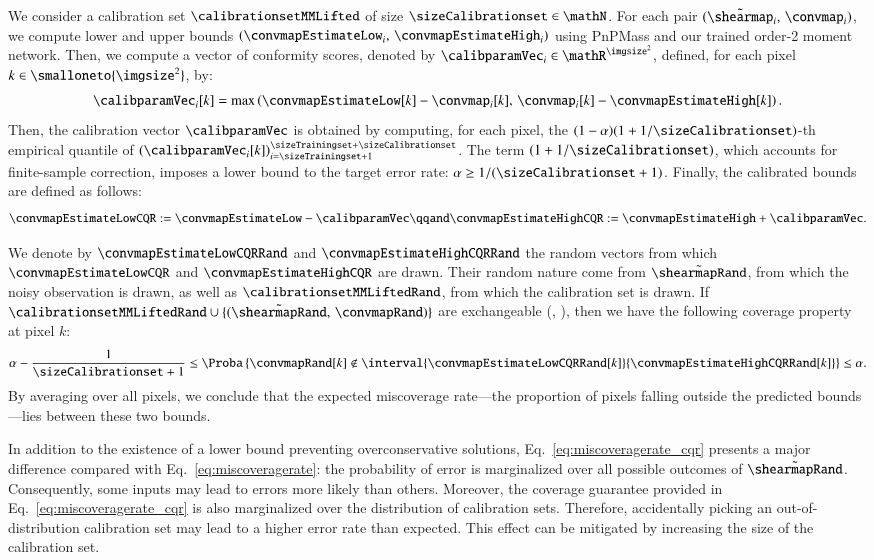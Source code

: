 \documentclass{aa}
\begin{document}
We consider a calibration set $\calibrationsetMMLifted$ of size $\sizeCalibrationset \in \mathN$. For each pair $(\tilde\shearmap_i,\, \convmap_i)$, we compute lower and upper bounds $(\convmapEstimateLow_i,\, \convmapEstimateHigh_i)$ using PnPMass and our trained order-2 moment network. Then, we compute a vector of conformity scores, denoted by $\calibparamVec_i \in \mathR^{\imgsize^2}$, defined, for each pixel $k \in \smalloneto{\imgsize^2}$, by:
\begin{equation}
    \calibparamVec_i[k] = \max\left(
        \convmapEstimateLow[k] - \convmap_i[k],\, \convmap_i[k] - \convmapEstimateHigh[k]
    \right).
\end{equation}
Then, the calibration vector $\calibparamVec$ is obtained by computing, for each pixel, the $(1 - \alpha)(1 + 1/\sizeCalibrationset)$-th empirical quantile of $(\calibparamVec_i[k])_{i=\sizeTrainingset + 1}^{\sizeTrainingset + \sizeCalibrationset}$. The term $(1 + 1/\sizeCalibrationset)$, which accounts for finite-sample correction, imposes a lower bound to the target error rate: $\alpha \geq 1 / (\sizeCalibrationset + 1)$.
Finally, the calibrated bounds are defined as follows:
\begin{equation}
    \convmapEstimateLowCQR := \convmapEstimateLow - \calibparamVec \qqand \convmapEstimateHighCQR := \convmapEstimateHigh + \calibparamVec.
\end{equation}

We denote by $\convmapEstimateLowCQRRand$ and $\convmapEstimateHighCQRRand$ the random vectors from which $\convmapEstimateLowCQR$ and $\convmapEstimateHighCQR$ are drawn. Their random nature come from $\tilde\shearmapRand$, from which the noisy observation is drawn, as well as $\calibrationsetMMLiftedRand$, from which the calibration set is drawn. If $\calibrationsetMMLiftedRand \cup \{(\tilde\shearmapRand,\, \convmapRand)\}$ are exchangeable (\eg, \iid), then we have the following coverage property at pixel $k$:
\begin{equation}
    \alpha - \frac1{\sizeCalibrationset + 1} \leq \Proba\left\{
        \convmapRand[k] \notin \interval{\convmapEstimateLowCQRRand[k]}{\convmapEstimateHighCQRRand[k]}
    \right\} \leq \alpha.
\label{eq:miscoveragerate_cqr}
\end{equation}
By averaging over all pixels, we conclude that the expected miscoverage rate---the proportion of pixels falling outside the predicted bounds---lies between these two bounds.

In addition to the existence of a lower bound preventing overconservative solutions, Eq.~\eqref{eq:miscoveragerate_cqr} presents a major difference compared with Eq.~\eqref{eq:miscoveragerate}: the probability of error is marginalized over all possible outcomes of $\tilde\shearmapRand$. Consequently, some inputs may lead to errors more likely than others. Moreover, the coverage guarantee provided in Eq.~\eqref{eq:miscoveragerate_cqr} is also marginalized over the distribution of calibration sets. Therefore, accidentally picking an out-of-distribution calibration set may lead to a higher error rate than expected. This effect can be mitigated by increasing the size of the calibration set.
\end{document}
